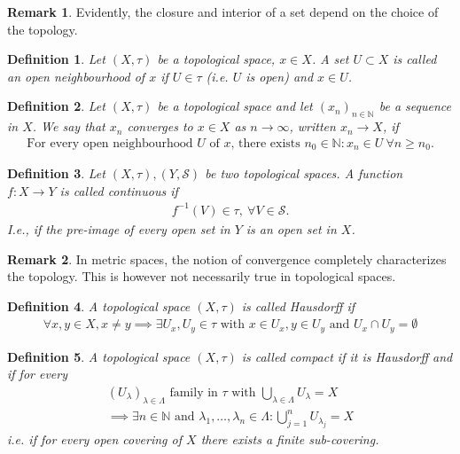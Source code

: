 \documentclass[11pt,a4paper]{article}
\newtheorem{defn}{Definition}[section]
\theoremstyle{definition}
\newtheorem{rem}{Remark}[section]
\begin{document}
\begin{rem} Evidently, the closure and interior of a set depend on the choice of the topology. 
\end{rem}
\begin{defn} Let $(X, \tau)$ be a topological space, $x \in X$. A set $U \subset X$ is called an open neighbourhood of $x$ if $U \in \tau$ (i.e. $U$ is open) and $x \in U$. 
\end{defn}
\newpage
\begin{defn} Let $(X, \tau)$ be a topological space and let $(x_n)_{n \in \mathbb{N}}$ be a sequence in $X$. We say that $x_n$ converges to $x \in X$ as $n \to \infty$, written $x_n \to X$, if \begin{align*}
\text{For every open neighbourhood $U$ of $x$, there exists $n_0 \in \mathbb{N}: x_n \in U \ \forall n \geq n_0.$}
\end{align*}
\end{defn}
\begin{defn} Let $(X, \tau), (Y , \mathcal{S})$ be two topological spaces. A function $f: X \to Y$ is called continuous if 
\begin{align*}
f^{-1}(V) \in \tau, \ \forall V \in \mathcal{S}.
\end{align*}
I.e., if the pre-image of every open set in $Y$ is an open set in $X$. 
\end{defn}
\begin{rem} In metric spaces, the notion of convergence completely characterizes the topology. This is however not necessarily true in topological spaces.
\end{rem}
\begin{defn} A topological space $(X, \tau)$ is called Hausdorff if  
\begin{align*}
\forall x,y \in X, x \neq y \implies \exists U_x, U_y \in \tau \text{ with } x \in U_x, y \in U_y \text{ and } U_x \cap U_y = \emptyset
\end{align*}
\end{defn}
\begin{defn} A topological space $(X, \tau)$ is called compact if it is Hausdorff and if for every \begin{align*}
(U_\lambda)_{\lambda \in \Lambda} \text{ family in } \tau \text{ with } \bigcup_{ \lambda \in \Lambda} U_\lambda = X \\ \implies \exists n \in \mathbb{N} \text{ and  } \lambda_1, \dots , \lambda_n \in \Lambda : \bigcup_{j=1}^n U_{\lambda_j}=X 
\end{align*}
i.e. if for every open covering of $X$ there exists a finite sub-covering. 
\end{defn}
\end{document}
